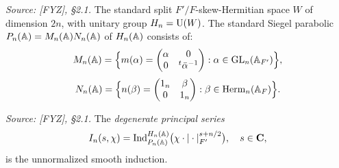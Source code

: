 \begin{definition}
  \label{def:siegel-parabolic}
  \textit{Source: [FYZ], \S2.1.}
  The standard split \(F'/F\)-skew-Hermitian space \(W\) of dimension \(2n\), with
  unitary group \(H_n = \operatorname{U}(W)\). The standard Siegel parabolic
  \(P_n(\mathbb{A}) = M_n(\mathbb{A}) N_n(\mathbb{A})\) of \(H_n(\mathbb{A})\) consists of:
  \[
    M_n(\mathbb{A}) = \Bigl\{ m(\alpha) = \begin{pmatrix}\alpha & 0 \\ 0 &
      {}^t\bar\alpha^{-1}\end{pmatrix} : \alpha \in \operatorname{GL}_n(\mathbb{A}_{F'}) \Bigr\},
  \]
  \[
    N_n(\mathbb{A}) = \Bigl\{ n(\beta) = \begin{pmatrix} 1_n & \beta \\ 0 & 1_n
    \end{pmatrix} : \beta \in \operatorname{Herm}_n(\mathbb{A}_F) \Bigr\}.
  \]
\end{definition}

\begin{definition}
  \label{def:degenerate-principal-series}
  \textit{Source: [FYZ], \S2.1.}
  The \emph{degenerate principal series}
  \[
    I_n(s, \chi) = \operatorname{Ind}_{P_n(\mathbb{A})}^{H_n(\mathbb{A})}
      \bigl(\chi \cdot |\cdot|_{F'}^{s + n/2}\bigr), \quad s \in \mathbf{C},
  \]
  is the unnormalized smooth induction.
\end{definition}

